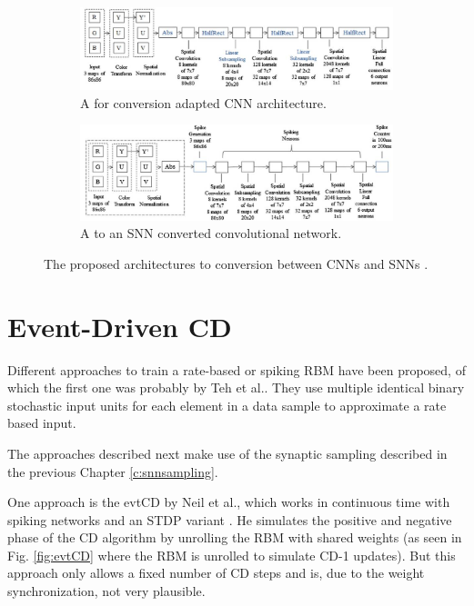 \begin{figure}
	\centering
	\begin{subfigure}[t]{.80\textwidth}
  		\centering
  		\includegraphics[width=.97\linewidth]{imgs/cnn_snn_conv1.jpg}
  		\caption{A for conversion adapted CNN architecture.}
  		\label{fig:sub1}
	\end{subfigure}%
	
	\begin{subfigure}[t]{.80\textwidth}
  		\centering
  		\includegraphics[width=.97\linewidth]{imgs/cnn_snn_conv2.jpg}
  		\caption{A to an SNN converted convolutional network.}
  		\label{fig:sub2}
	\end{subfigure}
	\caption{The proposed architectures to conversion between CNNs and SNNs \cite{Cao2014}. }
	\label{fig:csnnconv}
\end{figure}

\section{Event-Driven CD} \label{c:ecd}

Different approaches to train a rate-based or spiking RBM have been proposed, of which the first one was probably by Teh et al.\cite{Teh2005}.
They use multiple identical binary stochastic input units for each element in a data sample to approximate a rate based input.

The approaches described next make use of the synaptic sampling described in the previous Chapter \ref{c:snnsampling}.

One approach is the evtCD by Neil et al., which works in continuous time with spiking networks and an STDP variant \cite{Diehl2015}.
He simulates the positive and negative phase of the CD algorithm by unrolling the RBM with shared weights (as seen in Fig. \ref{fig:evtCD} where the RBM is unrolled to simulate CD-1 updates). 
But this approach only allows a fixed number of CD steps and is, due to the weight synchronization, not very plausible.

